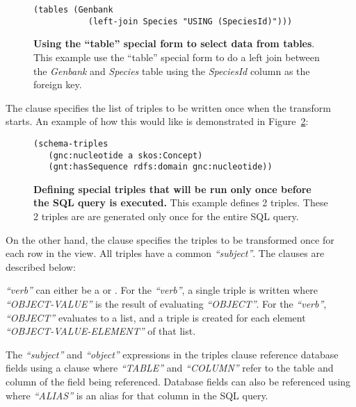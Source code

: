 \begin{figure}[H]
\centering
\begin{verbatim}
(tables (Genbank
           (left-join Species "USING (SpeciesId)")))
\end{verbatim}
\caption[\textit{``table''} special form]{\textbf{Using the ``table'' special form to select data from tables}.  This example use the ``table'' special form to do a left join between the \textit{Genbank} and \textit{Species} table using the \textit{SpeciesId} column as the foreign key.}\label{code:genbank-species-join-example}
\end{figure}

The  clause specifies the list of triples to be written once when the transform starts.  An example of how this would like is demonstrated in Figure~\ref{code:schema-triples-example}:

\begin{figure}[H]
\centering
\begin{verbatim}
(schema-triples
   (gnc:nucleotide a skos:Concept)
   (gnt:hasSequence rdfs:domain gnc:nucleotide))
\end{verbatim}
\caption[\textit{``schema-triples''} special form]{\textbf{Defining special triples that will be run only once before the SQL query is executed.}  This example defines 2 triples.  These 2 triples are are generated only once for the entire SQL query.}\label{code:schema-triples-example}
\end{figure}

On the other hand, the  clause specifies the triples to be transformed once for each row in the view.  All triples have a common \textit{``subject''}.  The  clauses are described below:

\textit{``verb''} can either be a  or .  For the  \textit{``verb''}, a single triple  is written where \textit{``OBJECT-VALUE''} is the result of evaluating \textit{``OBJECT''}.  For the  \textit{``verb''}, \textit{``OBJECT''} evaluates to a list, and a triple  is created for each element \textit{``OBJECT-VALUE-ELEMENT''} of that list.

The \textit{``subject''} and \textit{``object''} expressions in the triples clause reference database fields using a  clause where \textit{``TABLE''} and \textit{``COLUMN''} refer to the table and column of the field being referenced.  Database fields can also be referenced using  where \textit{``ALIAS''} is an alias for that column in the SQL query.

